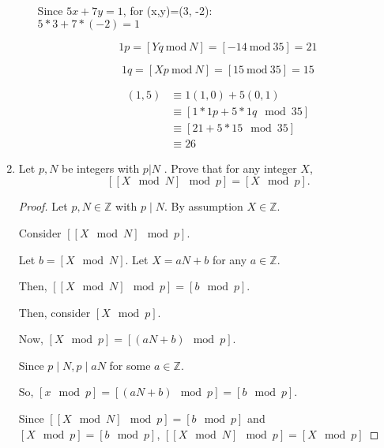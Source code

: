 \documentclass{article}
\begin{document}
\begin{enumerate}
\begin{enumerate}
        \indent Since $5x+7y=1$, for (x,y)=(3, -2): \\
        $5 * 3 + 7 * (-2) = 1$

        \begin{equation}
            1p = [Yq \ \mathrm{mod} \ N] = [-14  \ \mathrm{mod} \ 35] = 21
        \end{equation}

        \begin{equation}
            1q = [Xp \ \mathrm{mod} \ N] = [15 \ \mathrm{mod} \ 35] = 15
        \end{equation}

        \begin{align*}
          (1, 5) &\equiv 1(1, 0) + 5(0, 1)\\
                 &\equiv [1 * 1p + 5 * 1q \mod 35]\\
                 &\equiv [21 + 5 * 15 \mod 35]\\
                 &\equiv \boxed{26}
        \end{align*}

    \end{enumerate}
  \item Let $p, N$ be integers with $p | N$ . Prove that for any integer $X$,
    \[
      [[X \mod N ] \mod p ] = [X \mod p ].
    \]

    \begin{proof}
      Let $p, N \in \mathbb{Z}$ with $p \mid N$. By assumption $X \in \mathbb{Z}$.

      Consider $\left[\left[X \mod N\right] \mod p\right]$.

      Let $b = \left[X \mod N\right]$. Let $X = aN + b$ for any $a \in
      \mathbb{Z}$.

      Then, $\left[\left[X \mod N\right] \mod p\right] = \left[b \mod p\right]$.

      Then, consider $\left[X \mod p\right]$.

      Now, $\left[X \mod p\right] = \left[(aN + b) \mod p\right]$.

      Since $p \mid N, p \mid aN$ for some $a \in \mathbb{Z}$.

      So, $\left[x \mod p\right] = \left[(aN + b) \mod p\right] = \left[b \mod
      p\right]$.

      Since $\left[\left[X \mod N\right] \mod p\right] = \left[b \mod p\right]$
      and $\left[X \mod p\right] = \left[b \mod p\right]$, $\left[\left[X \mod
      N\right] \mod p\right] = \left[X \mod p\right]$
    \end{proof}


\end{enumerate}
\end{document}
